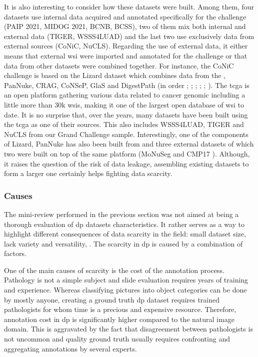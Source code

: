 It is also interesting to consider how these datasets were built. Among them, four datasets use internal data acquired and annotated specifically for the challenge (PAIP 2021, MIDOG 2021, BCNB, BCSS), two of them mix both internal and external data (TIGER, WSSS4LUAD) and the last two use exclusively data from external sources (CoNiC, NuCLS). Regarding the use of external data, it either means that external \acrshort{wsi} were imported and annotated for the challenge or that data from other datasets were combined together. For instance, the CoNiC challenge is based on the Lizard dataset \parencite{graham2021lizard} which combines data from the , PanNuke, CRAG, CoNSeP, GlaS and DigestPath (in order \cite{weinstein2013cancer}; \cite{gamper2019pannuke}; \cite{graham2019mild}; \cite{graham2019hover}; \cite{sirinukunwattana2017gland}; \cite{li2019signet}). The \acrshort{tcga} is an open platform gathering various data related to cancer genomic including a little more than 30k \acrlong{wsi}s, making it one of the largest open database of \acrshort{wsi} to date. It is no surprise that, over the years, many datasets have been built using the \acrshort{tcga} as one of their sources. This also includes WSSS4LUAD, TIGER and NuCLS from our Grand Challenge sample. Interestingly, one of the components of Lizard, PanNuke has also been built from  and three external datasets of which two were built on top of the same platform (MoNuSeg \parencite{kumar2019multi} and CMP17 \parencite{vu2019methods}). Although, it raises the question of the risk of data leakage, assembling existing datasets to form a larger one certainly helps fighting data scarcity.

\subsubsection{Causes}
\label{sssec:backdp:ds-causes}

The mini-review performed in the previous section was not aimed at being a thorough evaluation of \acrshort{dp} datasets characteristics. It rather serves as a way to highlight different consequences of data scarcity in the field: small dataset size, lack variety and versatility, \etc. The scarcity in \acrlong{dp} is caused by a combination of factors.  

One of the main causes of scarcity is the cost of the annotation process. Pathology is not a simple subject and slide evaluation requires years of training and experience. Whereas classifying pictures into object categories can be done by mostly anyone, creating a ground truth \acrlong{dp} dataset requires trained pathologists for whom time is a precious and expensive resource. Therefore, annotation cost in \acrlong{dp} is significantly higher compared to the natural image domain. This is aggravated by the fact that disagreement between pathologists is not uncommon and quality ground truth usually requires confronting and aggregating annotations by several experts. 


